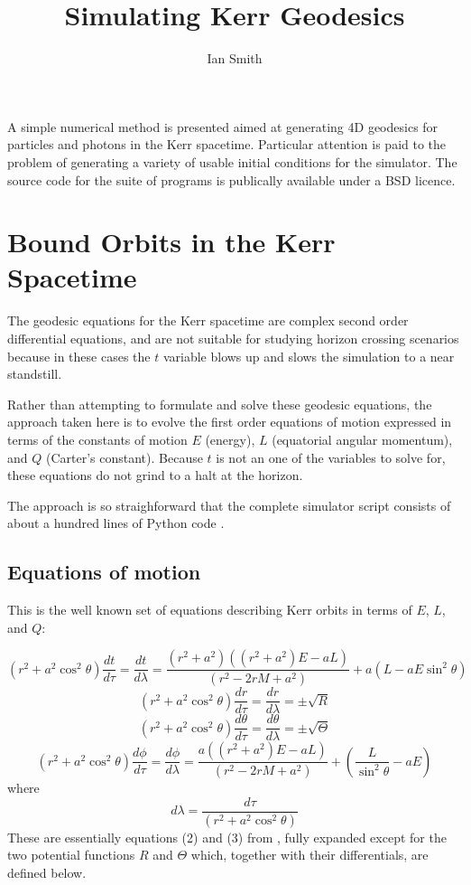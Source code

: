 \documentclass[11pt]{article}
\title{\textbf{Simulating Kerr Geodesics}}
\author{Ian Smith}
\date{}
\begin{document}
\maketitle

\abstract
A simple numerical method is presented aimed at generating 4D geodesics for particles and photons in the Kerr spacetime.  Particular attention is paid to the problem of generating a variety of usable initial conditions for the simulator.  The source code for the suite of programs is publically available under a BSD licence.

\section{Bound Orbits in the Kerr Spacetime}

The geodesic equations for the Kerr spacetime are complex second order differential equations, and are not suitable for studying horizon crossing scenarios because in these cases the $t$ variable blows up and slows the simulation to a near standstill.

Rather than attempting to formulate and solve these geodesic equations, the approach taken here is to evolve the first order equations of motion expressed in terms of the constants of motion $E$ (energy), $L$ (equatorial angular momentum), and $Q$ (Carter's constant).  Because $t$ is not an one of the variables to solve for, these equations do not grind to a halt at the horizon.

The approach is so straighforward that the complete simulator script consists of about a hundred lines of Python code \cite{m4r35n357}.

\subsection {Equations of motion}

This is the well known set of equations describing Kerr orbits in terms of $E$, $L$, and $Q$:

$$
(r^2 + a^2 \cos^2\theta) \frac{d t}{d \tau} = \frac{d t}{d \lambda} = \frac{(r^2 + a^2) ((r^2 + a^2) E - aL)} {({r}^{2} - 2rM  + {a}^{2})} + a(L - aE \sin^2 \theta)
$$
$$
(r^2 + a^2 \cos^2\theta) \frac{d r}{d \tau} = \frac{d r}{d \lambda} = \pm \sqrt R
$$
$$
(r^2 + a^2 \cos^2\theta) \frac{d \theta}{d \tau} = \frac{d \theta}{d \lambda} = \pm \sqrt \Theta
$$
$$
(r^2 + a^2 \cos^2\theta) \frac{d \phi}{d \tau}= \frac{d \phi}{d \lambda} = \frac{a ((r^2 + a^2) E - aL)} {({r}^{2} - 2rM  + {a}^{2})} + (\frac {L} {\sin^2 \theta} -aE)
$$
where
$$
d \lambda = \frac {d \tau} {(r^2 + a^2 \cos^2\theta)}
$$
These are essentially equations (2) and (3) from \cite{wilkins}, fully expanded except for the two potential functions $R$ and $\Theta$ which, together with their differentials, are defined below.
\end{document}
